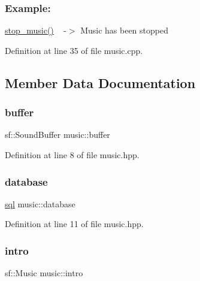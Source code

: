  \subsubsection*{Example\+: }

\hyperlink{classmusic_ae89df284db606b4fb68f9e99702a6872}{stop\+\_\+music()} ~\newline
-\/$>$ Music has been stopped ~\newline


Definition at line 35 of file music.\+cpp.



\subsection{Member Data Documentation}
\mbox{\label{classmusic_a20de39eece3638a2128136af4ad765e2}} 
\subsubsection{\texorpdfstring{buffer}{buffer}}
{\footnotesize\ttfamily sf\+::\+Sound\+Buffer music\+::buffer\hspace{0.3cm}{\ttfamily [private]}}



Definition at line 8 of file music.\+hpp.

\mbox{\label{classmusic_a483b70809538add9b52adcaaaddd3c7f}} 
\subsubsection{\texorpdfstring{database}{database}}
{\footnotesize\ttfamily \hyperlink{classsql}{sql} music\+::database\hspace{0.3cm}{\ttfamily [private]}}



Definition at line 11 of file music.\+hpp.

\mbox{\label{classmusic_a08beb3c6befa97938b98edae5bc6ec39}} 
\subsubsection{\texorpdfstring{intro}{intro}}
{\footnotesize\ttfamily sf\+::\+Music music\+::intro\hspace{0.3cm}{\ttfamily [private]}}



